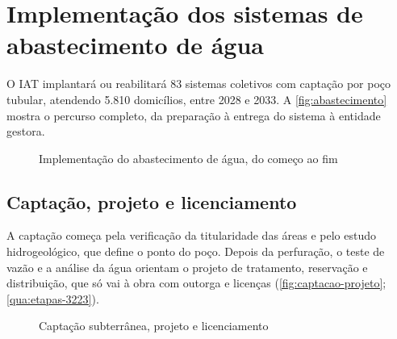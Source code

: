 \section{Implementação dos sistemas de abastecimento de água}
\label{sec:abastecimento}

O IAT implantará ou reabilitará 83 sistemas coletivos com captação por poço
tubular, atendendo 5.810 domicílios, entre 2028 e 2033. A
\autoref{fig:abastecimento} mostra o percurso completo, da preparação à
entrega do sistema à entidade gestora.

\begin{figure}[htbp]
  \centering
  \caption{Implementação do abastecimento de água, do começo ao fim}
  \label{fig:abastecimento}
\end{figure}

\subsection{Captação, projeto e licenciamento}
\label{subsec:captacao}

A captação começa pela verificação da titularidade das áreas e pelo estudo
hidrogeológico, que define o ponto do poço. Depois da perfuração, o teste de
vazão e a análise da água orientam o projeto de tratamento, reservação e
distribuição, que só vai à obra com outorga e licenças
(\autoref{fig:captacao-projeto}; \autoref{qua:etapas-3223}).

\begin{figure}[htbp]
  \centering
  \caption{Captação subterrânea, projeto e licenciamento}
  \label{fig:captacao-projeto}
\end{figure}


